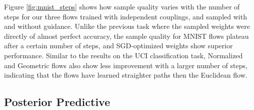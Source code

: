 Figure \ref{fig:mnist_steps} shows how sample quality varies with the number of steps for our three flows trained with independent couplings, and sampled with and without guidance. Unlike the previous task where the sampled weights were directly of almost perfect accuracy, the sample quality for MNIST flows plateau after a certain number of steps, and SGD-optimized weights show superior performance. Similar to the results on the UCI classification task, Normalized and Geometric flows also show less improvement with a larger number of steps, indicating that the flows have learned straighter paths then the Euclidean flow. 

\subsection{Posterior Predictive}


